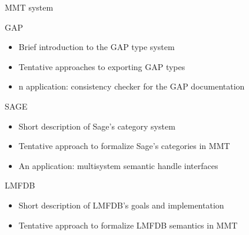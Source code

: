 \documentclass{llncs}
\begin{document}
\begin{description}
\item{MMT system}
\item{GAP} 
\begin{itemize}
\item Brief introduction to the GAP type system 
\item Tentative approaches to exporting GAP types 
\item n application: consistency checker for the GAP documentation
\end{itemize}
\item{SAGE} 
\begin{itemize}
\item Short description of Sage's category system 
\item Tentative approach to formalize Sage's categories in MMT 
\item An application: multisystem semantic handle interfaces
\end{itemize}
\item{LMFDB}
\begin{itemize}
\item Short description of LMFDB's goals and implementation 
\item Tentative approach to formalize LMFDB semantics in MMT
\end{itemize}
\end{description}










\printbibliography
\end{document}
